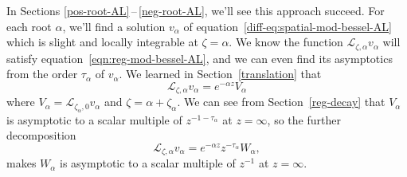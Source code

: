 \documentclass{article}
\theoremstyle{definition}
\newcommand{\fracderiv}[3]{\partial^{#1}_{#2, #3}}
\newcommand{\laplace}{\mathcal{L}}
\begin{document}
In Sections \ref{pos-root-AL}\,--\,\ref{neg-root-AL}, we'll see this approach succeed. For each root $\alpha$, we'll find a solution $v_\alpha$ of equation~\eqref{diff-eq:spatial-mod-bessel-AL} which is slight and locally integrable at $\zeta = \alpha$. We know the function $\laplace_{\zeta, \alpha} v_\alpha$ will satisfy equation~\eqref{eqn:reg-mod-bessel-AL}, and we can even find its asymptotics from the order $\tau_\alpha$ of $v_\alpha$. We learned in Section~\ref{translation} that
\[ \laplace_{\zeta, \alpha} v_\alpha = e^{-\alpha z} V_\alpha \]
where $V_\alpha = \laplace_{\zeta_\alpha, 0} v_\alpha$ and $\zeta = \alpha + \zeta_\alpha$. We can see from Section~\ref{reg-decay} that $V_\alpha$ is asymptotic to a scalar multiple of $z^{-1 - \tau_\alpha}$ at $z = \infty$, so the further decomposition
\[ \laplace_{\zeta, \alpha} v_\alpha = e^{-\alpha z} z^{-\tau_\alpha} W_\alpha, \]
makes $W_\alpha$ is asymptotic to a scalar multiple of $z^{-1}$ at $z = \infty$.
\end{document}
